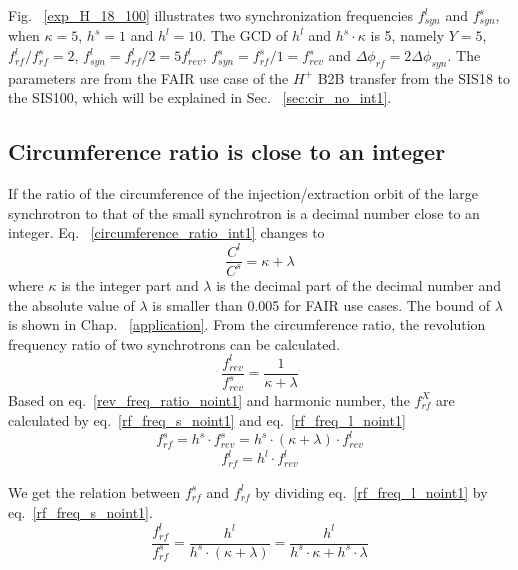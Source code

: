 Fig. ~\ref{exp_H_18_100} illustrates two synchronization frequencies $f_{\mathit{syn}}^{l}$ and $f_{\mathit{syn}}^{s}$, when $\kappa=5$, $h^s=1$ and $h^l=10$. The GCD of $h^l$ and $h^s \cdot \kappa$ is 5, namely $Y=5$, $f_{\mathit{rf}}^{l}/f_{\mathit{rf}}^{s}=2$, $f_{\mathit{syn}}^{l}=f_{\mathit{rf}}^{l}/2=5f_{\mathit{rev}}^{l}$, $f_{\mathit{syn}}^{s}=f_{\mathit{rf}}^{s}/1=f_{\mathit{rev}}^{s}$ and $\Delta \phi_\mathit{rf}=2\Delta \phi_\mathit{syn}$.  The parameters are from the FAIR use case of the $H^{+}$ B2B transfer from the SIS18 to the SIS100, which will be explained in Sec. ~\ref{sec:cir_no_int1}.


\subsection{Circumference ratio is close to an integer}
\label{sec:cir_close_an_int}
If the ratio of the circumference of the injection/extraction orbit of the large synchrotron to that of the small synchrotron is a decimal number close to an integer. Eq. ~\ref{circumference_ratio_int1} changes to 
\begin{equation}
\frac{C^l}{C^s}= \kappa + \lambda \label{circumference_ratio_noint0}
\end{equation}
where $\kappa$ is the integer part and $\lambda$ is the decimal part of the decimal number and the absolute value of $\lambda$ is smaller than 0.005 for FAIR use cases. The bound of $\lambda$ is shown in Chap. ~\ref{application}. From the circumference ratio, the revolution frequency ratio of two synchrotrons can be calculated.
\begin{equation}
\frac{f_{\mathit{rev}}^{l}}{f_{\mathit{rev}}^{s}}=\frac{1}{ \kappa+ \lambda} \label{rev_freq_ratio_noint1}
\end{equation}
Based on eq.~\ref{rev_freq_ratio_noint1} and harmonic number, the $f_{\mathit{rf}}^{X}$ are calculated by eq.~\ref{rf_freq_s_noint1} and eq.~\ref{rf_freq_l_noint1}
\begin{equation} 
f_{\mathit{rf}}^{s}= h^s \cdot f_{\mathit{rev}}^{s}=h^s \cdot ( \kappa+ \lambda) \cdot f_{\mathit{rev}}^{l} \label{rf_freq_s_noint1}
\end{equation}
\begin{equation} 
f_{\mathit{rf}}^{l}= h^l \cdot f_{\mathit{rev}}^{l} \label{rf_freq_l_noint1}
\end{equation}

We get the relation between $f_{\mathit{rf}}^{s}$ and $f_{\mathit{rf}}^{l}$ by dividing eq.~\ref{rf_freq_l_noint1} by eq.~\ref{rf_freq_s_noint1}.
\begin{equation} 
\frac{f_{\mathit{rf}}^{l}}{f_{\mathit{rf}}^{s}}=\frac{h^l}{h^s \cdot ( \kappa+ \lambda)}=\frac{h^l}{h^s \cdot  \kappa+ h^s \cdot \lambda}\label{close_to_interger_31}
\end{equation}

